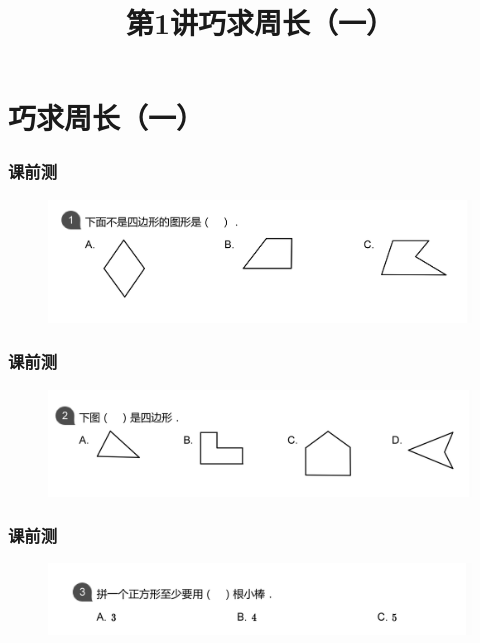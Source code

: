 \section{巧求周长（一）}

\title[第1讲\quad 巧求周长（一）]{第1讲\quad 巧求周长（一）} 
\author{}
\date{}
\begin{frame}
    \titlepage
\end{frame}

\begin{frame}
    \frametitle{课前测}
    \begin{figure}[H] %
        \centering %
        \includegraphics[width=1\textwidth]{./pics/Chapter_1/1.png} %
    \end{figure}
    
\end{frame}

\begin{frame}
    \frametitle{课前测}
    \begin{figure}[H] 
        \centering
        \includegraphics[width=1\textwidth]{./pics/Chapter_1/2.png}
    \end{figure}
\end{frame}

\begin{frame}
    \frametitle{课前测}
    \begin{figure}[H] 
        \centering
        \includegraphics[width=1\textwidth]{./pics/Chapter_1/3.png}
    \end{figure}
\end{frame}

